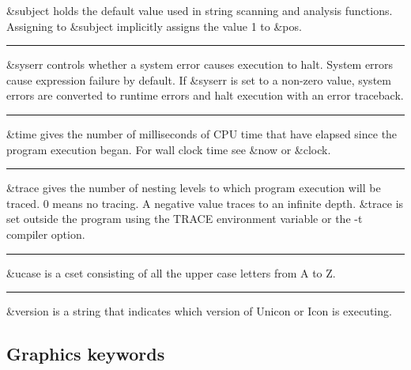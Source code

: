 \noindent
{}\textsf{\&subject} holds the default
value used in string scanning and analysis functions. Assigning to
\textsf{\&subject} implicitly assigns the value \textsf{1} to
\textsf{\&pos}.

\bigskip\hrule\vspace{0.1cm}

\noindent
\textsf{\&syserr} controls whether a system error causes execution to
halt. System errors cause expression failure by
default. If \textsf{\&syserr} is set to a non-zero value, system errors
are converted to runtime errors and halt execution with an error
traceback.

\bigskip\hrule\vspace{0.1cm}

\noindent
{}\textsf{\&}\textsf{time}
gives the number of milliseconds of CPU time that have elapsed since
the program execution began. For wall clock time see \textsf{\&now} or
\textsf{\&clock}.

\bigskip\hrule\vspace{0.1cm}

\noindent
\textsf{\&trace} gives the number of nesting levels to which
program execution will be traced. 0 means no tracing.
A negative value traces to an infinite depth.
\textsf{\&trace} is set outside the program using the \textsf{TRACE}
environment variable or the
\textsf{{}-t} compiler option.

\bigskip\hrule\vspace{0.1cm}

\noindent
{}\textsf{\&ucase} is a cset consisting of all the upper
case letters from A to Z.

\bigskip\hrule\vspace{0.1cm}

\noindent
{}\textsf{\&version} is a string that indicates which
version of Unicon or Icon is executing.

\subsection*{Graphics keywords}

